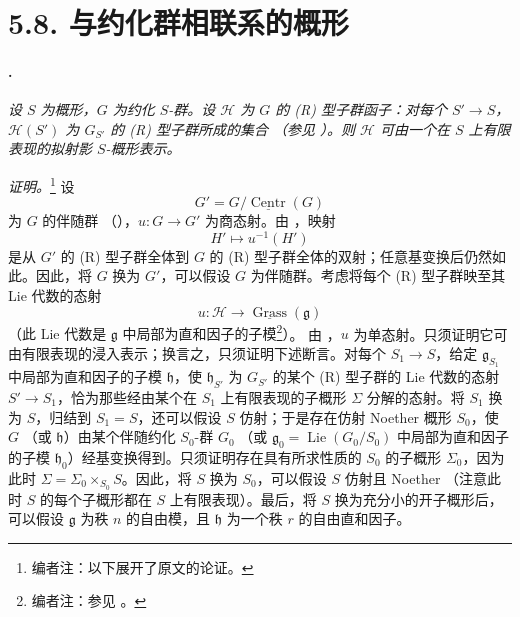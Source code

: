 \section*{5.8. 与约化群相联系的概形}

\paragraph{.}
\textit{设 \(S\) 为概形，\(G\) 为约化 \(S\)-群。设 \(\mathcal H\) 为 \(G\) 的 \textup{(R)} 型子群函子：对每个 \(S'\to S\)，\(\mathcal H(S')\) 为 \(G_{S'}\) 的 \textup{(R)} 型子群所成的集合 \textup{（参见 ）}。则 \(\mathcal H\) 可由一个在 \(S\) 上有限表现的拟射影 \(S\)-概形表示。}

\textit{证明。}\footnote{编者注：以下展开了原文的论证。}
设
\[
  G'=G/\underline{\operatorname{Centr}}(G)
\]
为 \(G\) 的伴随群 \textup{（）}，\(u\colon G\to G'\) 为商态射。由 ，映射
\[
  H'\longmapsto u^{-1}(H')
\]
是从 \(G'\) 的 \textup{(R)} 型子群全体到 \(G\) 的 \textup{(R)} 型子群全体的双射；任意基变换后仍然如此。因此，将 \(G\) 换为 \(G'\)，可以假设 \(G\) 为伴随群。考虑将每个 \textup{(R)} 型子群映至其 Lie 代数的态射
\[
  u\colon
  \mathcal H
  \longrightarrow
  \underline{\operatorname{Grass}}(\mathfrak g)
\]
\textup{（此 Lie 代数是 \(\mathfrak g\) 中局部为直和因子的子模\footnote{编者注：参见 。}）}。
由 ，\(u\) 为单态射。只须证明它可由有限表现的浸入表示；换言之，只须证明下述断言。对每个 \(S_1\to S\)，给定 \(\mathfrak g_{S_1}\) 中局部为直和因子的子模 \(\mathfrak h\)，使 \(\mathfrak h_{S'}\) 为 \(G_{S'}\) 的某个 \textup{(R)} 型子群的 Lie 代数的态射 \(S'\to S_1\)，恰为那些经由某个在 \(S_1\) 上有限表现的子概形 \(\Sigma\) 分解的态射。将 \(S_1\) 换为 \(S\)，归结到 \(S_1=S\)，还可以假设 \(S\) 仿射；于是存在仿射 Noether 概形 \(S_0\)，使 \(G\) \textup{（或 \(\mathfrak h\)）}由某个伴随约化 \(S_0\)-群 \(G_0\) \textup{（或 \(\mathfrak g_0=\operatorname{Lie}(G_0/S_0)\) 中局部为直和因子的子模 \(\mathfrak h_0\)）}经基变换得到。只须证明存在具有所求性质的 \(S_0\) 的子概形 \(\Sigma_0\)，因为此时 \(\Sigma=\Sigma_0\times_{S_0}S\)。因此，将 \(S\) 换为 \(S_0\)，可以假设 \(S\) 仿射且 Noether \textup{（注意此时 \(S\) 的每个子概形都在 \(S\) 上有限表现）}。最后，将 \(S\) 换为充分小的开子概形后，可以假设 \(\mathfrak g\) 为秩 \(n\) 的自由模，且 \(\mathfrak h\) 为一个秩 \(r\) 的自由直和因子。

